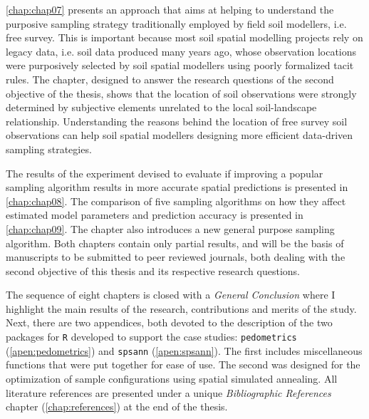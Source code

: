 \autoref{chap:chap07} presents an approach that aims at helping to understand the purposive sampling strategy 
traditionally employed by field soil modellers, i.e. free survey. This is important because most soil 
spatial modelling projects rely on legacy data, i.e. soil data produced many years ago, whose observation 
locations were purposively selected by soil spatial modellers using poorly formalized tacit rules. The 
chapter, designed to answer the research questions of the second objective of the thesis, shows that the 
location of soil observations were strongly determined by subjective elements unrelated to the local 
soil-landscape relationship. Understanding the reasons behind the location of free survey soil observations 
can help soil spatial modellers designing more efficient data-driven sampling strategies.

The results of the experiment devised to evaluate if improving a popular sampling algorithm results in more 
accurate spatial predictions is presented in \autoref{chap:chap08}. The comparison of five sampling algorithms 
on how they affect estimated model parameters and prediction accuracy is presented in \autoref{chap:chap09}. 
The chapter also introduces a new general purpose sampling algorithm. Both chapters contain only partial 
results, and will be the basis of manuscripts to be submitted to peer reviewed journals, both dealing with the 
second objective of this thesis and its respective research questions.

The sequence of eight chapters is closed with a \emph{General Conclusion} where I highlight the main results 
of the research, contributions and merits of the study. Next, there are two appendices, both devoted to the 
description of the two packages for \texttt{R} developed to support the case studies: \texttt{pedometrics} 
(\autoref{apen:pedometrics}) and \texttt{spsann} (\autoref{apen:spsann}). The first includes miscellaneous 
functions that were put together for ease of use. The second was designed for the optimization of sample 
configurations using spatial simulated annealing. All literature references are presented under a unique 
\emph{Bibliographic References} chapter (\autoref{chap:references}) at the end of the thesis.
